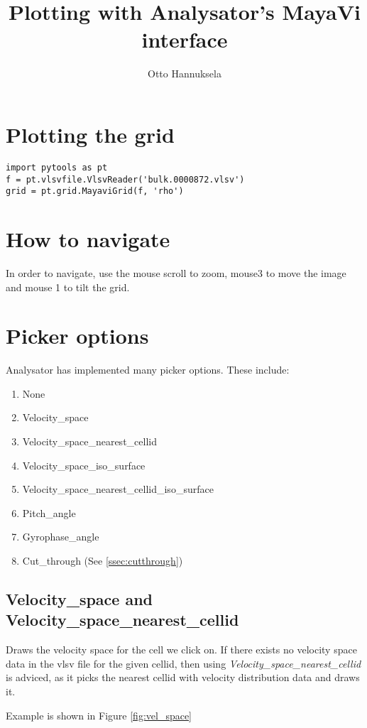 \documentclass[a4paper,10pt]{article}
\title{Plotting with Analysator's MayaVi interface}
\author{Otto Hannuksela}
\begin{document}
\maketitle

\tableofcontents

\newpage

\section{Plotting the grid}

\begin{verbatim}
import pytools as pt
f = pt.vlsvfile.VlsvReader('bulk.0000872.vlsv')
grid = pt.grid.MayaviGrid(f, 'rho')
\end{verbatim}

\section{How to navigate}

In order to navigate, use the mouse scroll to zoom, mouse3 to move the image and mouse 1 to tilt the 
grid.

\section{Picker options}

Analysator has implemented many picker options. These include:

\begin{enumerate}
 \item None
 \item Velocity_space
 \item Velocity_space_nearest_cellid
 \item Velocity_space_iso_surface
 \item Velocity_space_nearest_cellid_iso_surface
 \item Pitch_angle
 \item Gyrophase_angle
 \item Cut_through (See \ref{ssec:cutthrough})
\end{enumerate}


\subsection{Velocity_space and Velocity_space_nearest_cellid}

Draws the velocity space for the cell we click on. If there exists no velocity space data in the vlsv 
file for the given cellid, then using \emph{Velocity_space_nearest_cellid} is adviced, as it picks the 
nearest cellid with velocity distribution data and draws it.

Example is shown in Figure \ref{fig:vel_space}

\begin{figure}
 
\end{figure}
\end{document}
